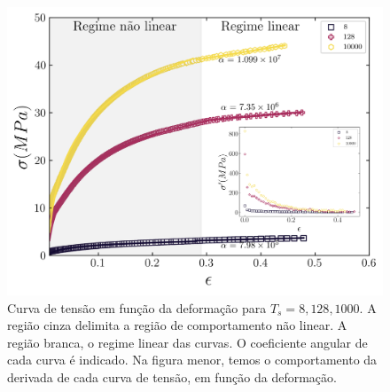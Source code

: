\documentclass[11pt,a4paper]{article} %
\begin{document}
        \begin{figure}[H] 

            \centering 
            \includegraphics[width=\textwidth]{figures/stress_fit.png} 
            \caption{Curva de tensão em função da deformação para \(T_{s} = 8, 128, 1000\). A região cinza delimita a  
            região de comportamento não linear. A região branca, o regime linear das curvas. O coeficiente angular de cada  
            curva é indicado. Na figura menor, temos o comportamento da derivada de cada curva de tensão, em função da  
            deformação.}
            \label{R8} 

        \end{figure} 
\end{document}
